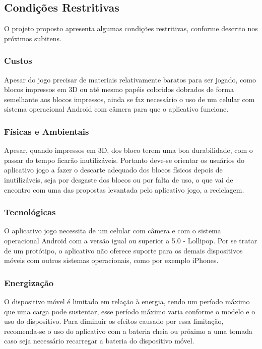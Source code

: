     \subsection{Condições Restritivas}
    O projeto proposto apresenta algumas condições restritivas, conforme descrito nos próximos subitens.

        \subsubsection{Custos}
        Apesar do jogo precisar de materiais relativamente baratos para ser jogado, como blocos impressos em 3D ou até mesmo papéis coloridos dobrados de forma semelhante aos blocos impressos, ainda se faz necessário o uso de um celular com sistema operacional Android com câmera para que o aplicativo funcione. 
            
        \subsubsection{Físicas e Ambientais}
        Apesar, quando impressos em 3D, dos bloco terem uma boa durabilidade, com o passar do tempo ficarão inutilizáveis. Portanto deve-se orientar os usuários do aplicativo jogo a fazer o descarte adequado dos blocos físicos depois de inutilizáveis, seja por desgaste dos blocos ou por falta de uso, o que vai de encontro com uma das propostas levantada pelo aplicativo jogo, a reciclagem.
        
        \subsubsection{Tecnológicas}
        O aplicativo jogo necessita de um celular com câmera e com o sistema operacional Android com a versão igual ou superior a 5.0 - Lollipop. Por se tratar de um protótipo, o aplicativo não oferece suporte para os demais dispositivos móveis com outros sistemas operacionais, como por exemplo iPhones. 
        
        \subsubsection{Energização}
        O dispositivo móvel é limitado em relação à energia, tendo um período máximo que uma carga pode sustentar, esse período máximo varia conforme o modelo e o uso do dispositivo. Para diminuir os efeitos causado por essa limitação, recomenda-se o uso do aplicativo com a bateria cheia ou próximo a uma tomada caso seja necessário recarregar a bateria do dispositivo móvel.    
        
